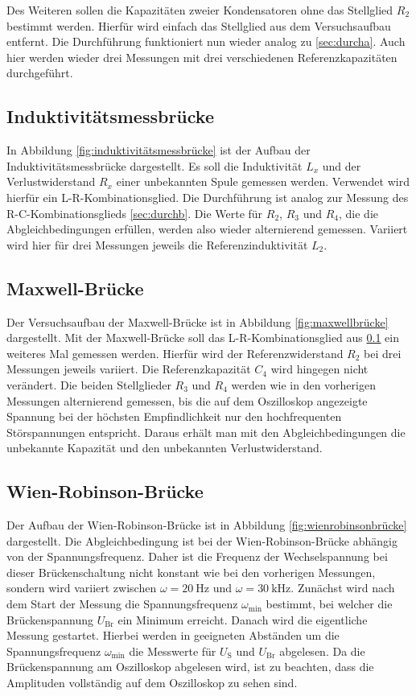Des Weiteren sollen die Kapazitäten zweier Kondensatoren ohne das Stellglied $R_2$ bestimmt werden.
Hierfür wird einfach das Stellglied aus dem Versuchsaufbau entfernt.
Die Durchführung funktioniert nun wieder analog zu \ref{sec:durcha}.
Auch hier werden wieder drei Messungen mit drei verschiedenen Referenzkapazitäten durchgeführt.

\subsection{Induktivitätsmessbrücke}
\label{sec:durchc}

In Abbildung \ref{fig:induktivitätsmessbrücke} ist der Aufbau der Induktivitätsmessbrücke dargestellt.
Es soll die Induktivität $L_x$ und der Verlustwiderstand $R_x$ einer unbekannten Spule gemessen werden.
Verwendet wird hierfür ein L-R-Kombinationsglied.
Die Durchführung ist analog zur Messung des R-C-Kombinationsglieds \ref{sec:durchb}.
Die Werte für $R_2$, $R_3$ und $R_4$, die die Abgleichbedingungen erfüllen, werden also wieder alternierend gemessen.
Variiert wird hier für drei Messungen jeweils die Referenzinduktivität $L_2$.

\subsection{Maxwell-Brücke}

Der Versuchsaufbau der Maxwell-Brücke ist in Abbildung \ref{fig:maxwellbrücke} dargestellt.
Mit der Maxwell-Brücke soll das L-R-Kombinationsglied aus \ref{sec:durchc} ein weiteres Mal gemessen werden.
Hierfür wird der Referenzwiderstand $R_2$ bei drei Messungen jeweils variiert.
Die Referenzkapazität $C_4$ wird hingegen nicht verändert.
Die beiden Stellglieder $R_3$ und $R_4$ werden wie in den vorherigen Messungen alternierend gemessen, bis die auf dem Oszilloskop angezeigte Spannung bei der höchsten Empfindlichkeit nur den hochfrequenten Störspannungen entspricht.
Daraus erhält man mit den Abgleichbedingungen die unbekannte Kapazität und den unbekannten Verlustwiderstand.

\subsection{Wien-Robinson-Brücke}
Der Aufbau der Wien-Robinson-Brücke ist in Abbildung \ref{fig:wienrobinsonbrücke} dargestellt.
Die Abgleichbedingung ist bei der Wien-Robinson-Brücke abhängig von der Spannungsfrequenz.
Daher ist die Frequenz der Wechselspannung bei dieser Brückenschaltung nicht konstant wie
bei den vorherigen Messungen, sondern wird variiert zwischen $\omega = \SI{20}{\Hz}$ und $\omega = \SI{30}{\kHz}$.
Zunächst wird nach dem Start der Messung die Spannungsfrequenz $\omega_{\text{min}}$ bestimmt, bei welcher die Brückenspannung $U_{\text{Br}}$ ein Minimum erreicht.
Danach wird die eigentliche Messung gestartet.
Hierbei werden in geeigneten Abständen um die Spannungsfrequenz $\omega_{\text{min}}$ die Messwerte für $U_{\text{S}}$ und $U_{\text{Br}}$ abgelesen.
Da die Brückenspannung am Oszilloskop abgelesen wird, ist zu beachten, dass die Amplituden vollständig auf dem Oszilloskop zu sehen sind.
\newpage
